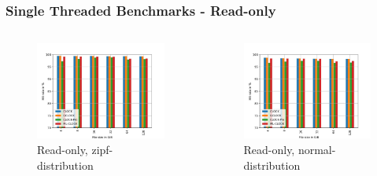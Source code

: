 \documentclass[
	aspectratio=169,
	compress,
]{beamer}
\newcommand{\navframetitle}[1]{\frametitle{#1\hfill{\footnotesize\lastsection{}}}}
\begin{document}
\begin{frame}[fragile]
	\navframetitle{Single Threaded Benchmarks - Read-only}

	\begin{columns}
		\begin{column}{0.5\textwidth}
			\begin{figure}
        		\includegraphics[width=\textwidth]{randread_zipf.jpg}
        		\caption{Read-only, zipf-distribution}
			\end{figure}
		\end{column}
		\begin{column}{0.5\textwidth}
			\begin{figure}[ht]
    			\centering
    			\includegraphics[width=\textwidth]{randread_normal.jpg}
        		\caption{Read-only, normal-distribution}
			\end{figure}			
		\end{column}
	\end{columns}
\end{frame}
\end{document}
